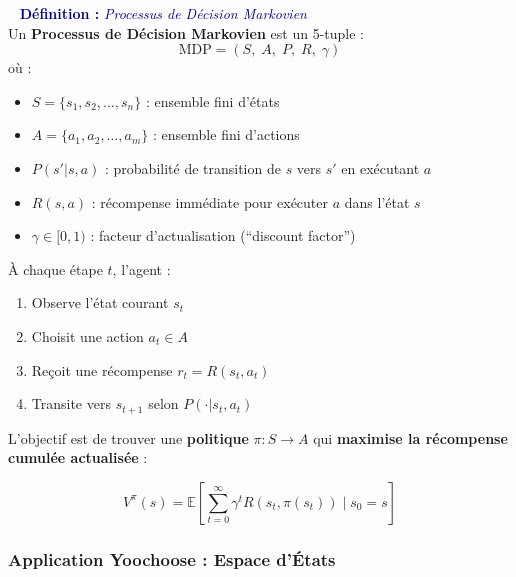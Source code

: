 \documentclass[11pt,a4paper]{article}
\newenvironment{defbox}[1]{%
  \vspace{3pt}\begin{framed}
  \noindent{\color{NavyBlue}\rule{0.3cm}{3pt}}~%
  \textcolor{DarkBlue}{\textbf{Définition :} \textit{#1}}\\[3pt]}
  {\end{framed}\vspace{3pt}}
\newcommand{\E}{\mathbb{E}}
\begin{document}
\begin{defbox}{Processus de Décision Markovien}
Un \textbf{Processus de Décision Markovien} est un 5-tuple :
\[
  \text{MDP} = (S,\; A,\; P,\; R,\; \gamma)
\]
où :
\begin{itemize}[leftmargin=1.5cm,itemsep=2pt]
  \item $S = \{s_1, s_2, \ldots, s_n\}$ : ensemble fini d'états
  \item $A = \{a_1, a_2, \ldots, a_m\}$ : ensemble fini d'actions
  \item $P(s'|s,a)$ : probabilité de transition de $s$ vers $s'$ en exécutant $a$
  \item $R(s,a)$ : récompense immédiate pour exécuter $a$ dans l'état $s$
  \item $\gamma \in [0,1)$ : facteur d'actualisation (``discount factor'')
\end{itemize}
\end{defbox}
 
À chaque étape $t$, l'agent :
\begin{enumerate}[leftmargin=1.5cm,itemsep=2pt]
  \item Observe l'état courant $s_t$
  \item Choisit une action $a_t \in A$
  \item Reçoit une récompense $r_t = R(s_t, a_t)$
  \item Transite vers $s_{t+1}$ selon $P(\cdot|s_t, a_t)$
\end{enumerate}
 
L'objectif est de trouver une \textbf{politique} $\pi : S \to A$ qui
\textbf{maximise la récompense cumulée actualisée} :
 
\[
  \boxed{V^\pi(s) = \E\left[\sum_{t=0}^{\infty} \gamma^t R(s_t,\pi(s_t)) \mid s_0=s\right]}
\]
 
\subsubsection{Application Yoochoose : Espace d'États}
 
\end{document}

